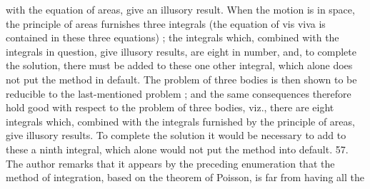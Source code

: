 \documentclass[12pt,a4paper]{article}
\theoremstyle{definition}
\begin{document}
with the equation of areas, give an illusory result. When the motion is in space, the
principle of areas furnishes three integrals (the equation of vis viva is contained in
these three equations) ; the integrals which, combined with the integrals in question,
give illusory results, are eight in number, and, to complete the solution, there must
be added to these one other integral, which alone does not put the method in default.
The problem of three bodies is then shown to be reducible to the last-mentioned
problem ; and the same consequences therefore hold good with respect to the problem
of three bodies, viz., there are eight integrals which, combined with the integrals
furnished by the principle of areas, give illusory results. To complete the solution it
would be necessary to add to these a ninth integral, which alone would not put the
method into default.
57. The author remarks that it appears by the preceding enumeration that the
method of integration, based on the theorem of Poisson, is far from having all the


\end{document}
